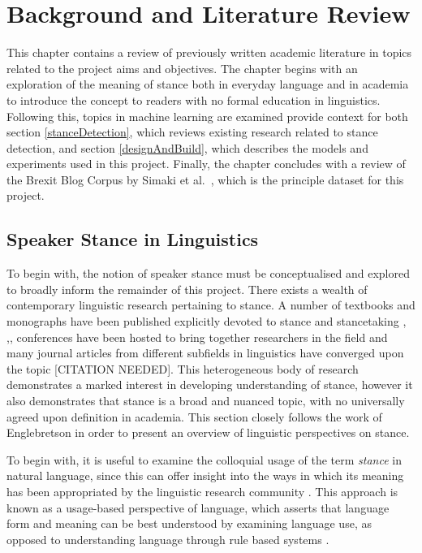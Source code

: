 \documentclass[Dissertation.tex]{subfiles}
\begin{document}
\chapter{Background and Literature Review}
This chapter contains a review of previously written academic literature in topics related to the project aims and objectives. The chapter begins with an exploration of the meaning of stance both in everyday language and in academia to introduce the concept to readers with no formal education in linguistics.  Following this, topics in machine learning are examined provide context for both section \ref{stanceDetection}, which reviews existing research related to stance detection, and section \ref{designAndBuild}, which describes the models and experiments used in this project. Finally, the chapter concludes with a review of the Brexit Blog Corpus by Simaki et al.\ \cite{simakiAnnotatingSpeakerStance2017}, which is the principle dataset for this project.
 
\section{Speaker Stance in Linguistics}\label{sec:speakerStanceLing}
To begin with, the notion of speaker stance must be conceptualised and explored to broadly inform the remainder of this project. There exists a wealth of contemporary linguistic research pertaining to stance. A number of textbooks and monographs have been published explicitly devoted to stance and stancetaking
\cite{hunstonEvaluationTextAuthorial2000}, \cite{englebretsonStancetakingDiscourseSubjectivity2007},\cite{karkkainenEpistemicStanceEnglish2003}, 
%
conferences have been hosted to bring together researchers in the field
%
%
and  many journal articles from different subfields in linguistics have converged upon the topic [CITATION NEEDED]. This heterogeneous body of research demonstrates a marked interest in developing understanding of stance, however it also demonstrates that stance is a broad and nuanced topic, with no universally agreed upon definition in academia. This section closely follows the work of Englebretson \cite{englebretsonStancetakingDiscourseSubjectivity2007} in order to present an overview of linguistic perspectives on stance.

To begin with, it is useful to examine the colloquial usage of the term \textit{stance} in natural language, since this can offer insight into the ways in which its meaning has been appropriated by the linguistic research community \cite{englebretsonStancetakingDiscourseSubjectivity2007}. This approach is known as a usage-based perspective of language, which asserts that language form and meaning can be best understood by examining language use, as opposed to understanding language through rule based systems \cite{barlowUsagebasedModelsLanguage2000}. 
\end{document}
